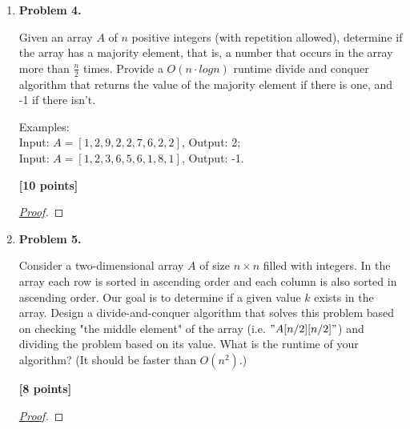 \documentclass[11pt]{article}
\begin{document}
\begin{enumerate}
\begin{flushright}
\textbf{[4 points]}
\end{flushright}

\begin{proof}[\underline{Proof}]


\end{proof}


\item \textbf{Problem 4.}

Given an array \(A\) of \(n\) positive integers (with repetition allowed), determine if the array has a majority element, that is, a number that occurs in the array more than \(\frac{n}{2}\) times. Provide a \(O(n \cdot log n)\) runtime divide and conquer algorithm that returns the value of the majority element if there is one, and -1 if there isn't.

Examples:\\
Input: \(A = [1, 2, 9, 2, 2, 7, 6, 2, 2]\), Output: 2;\\
Input: \(A = [1, 2, 3, 6, 5, 6, 1, 8, 1]\), Output: -1.

\begin{flushright}
\textbf{[10 points]}
\end{flushright}

\begin{proof}[\underline{Proof}]


\end{proof}

\item \textbf{Problem 5.}

Consider a two-dimensional array \(A\) of size \(n \times n\) filled with integers. In the array each row is sorted in ascending order and each column is also sorted in ascending order. Our goal is to determine if a given value \(k\) exists in the array. Design a divide-and-conquer algorithm that solves this problem based on
checking "the middle element" of the array (i.e. \("A[n/2][n/2]"\)) and dividing the problem based on its value. What is the runtime of your algorithm? (It should be faster than \(O(n^2)\).)

\begin{flushright}
\textbf{[8 points]}
\end{flushright}

\begin{proof}[\underline{Proof}]


\end{proof}

\end{enumerate}
\end{document}
